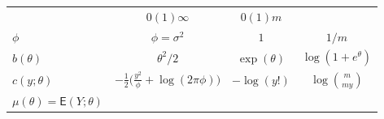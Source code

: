 \documentclass[12pt,a4paper,UTF8,twoside]{book}
\theoremstyle{definition}
\theoremstyle{definition}
\theoremstyle{definition}
\theoremstyle{remark}
\begin{document}
\begin{longtable}[]{@{}lccc@{}}
\begin{minipage}[t]{0.22\columnwidth}
\end{minipage} & \begin{minipage}[t]{0.22\columnwidth}\centering
\(0(1)\infty\)\strut
\end{minipage} & \begin{minipage}[t]{0.22\columnwidth}\centering
\(0(1)m\)\strut
\end{minipage}\tabularnewline
\begin{minipage}[t]{0.21\columnwidth}\raggedright
\(\phi\)\strut
\end{minipage} & \begin{minipage}[t]{0.22\columnwidth}\centering
\(\phi = \sigma^2\)\strut
\end{minipage} & \begin{minipage}[t]{0.22\columnwidth}\centering
\(1\)\strut
\end{minipage} & \begin{minipage}[t]{0.22\columnwidth}\centering
\(1/m\)\strut
\end{minipage}\tabularnewline
\begin{minipage}[t]{0.21\columnwidth}\raggedright
\(b(\theta)\)\strut
\end{minipage} & \begin{minipage}[t]{0.22\columnwidth}\centering
\(\theta^2/2\)\strut
\end{minipage} & \begin{minipage}[t]{0.22\columnwidth}\centering
\(\exp(\theta)\)\strut
\end{minipage} & \begin{minipage}[t]{0.22\columnwidth}\centering
\(\log(1+e^{\theta})\)\strut
\end{minipage}\tabularnewline
\begin{minipage}[t]{0.21\columnwidth}\raggedright
\(c(y;\theta)\)\strut
\end{minipage} & \begin{minipage}[t]{0.22\columnwidth}\centering
\(-\frac{1}{2}\big( \frac{y^2}{\phi} + \log(2\pi\phi) \big)\)\strut
\end{minipage} & \begin{minipage}[t]{0.22\columnwidth}\centering
\(-\log(y!)\)\strut
\end{minipage} & \begin{minipage}[t]{0.22\columnwidth}\centering
\(\log\binom{m}{my}\)\strut
\end{minipage}\tabularnewline
\begin{minipage}[t]{0.21\columnwidth}\raggedright
\(\mu(\theta) = \mathsf{E}(Y;\theta)\)\strut

\end{minipage}
\end{longtable}
\end{document}
